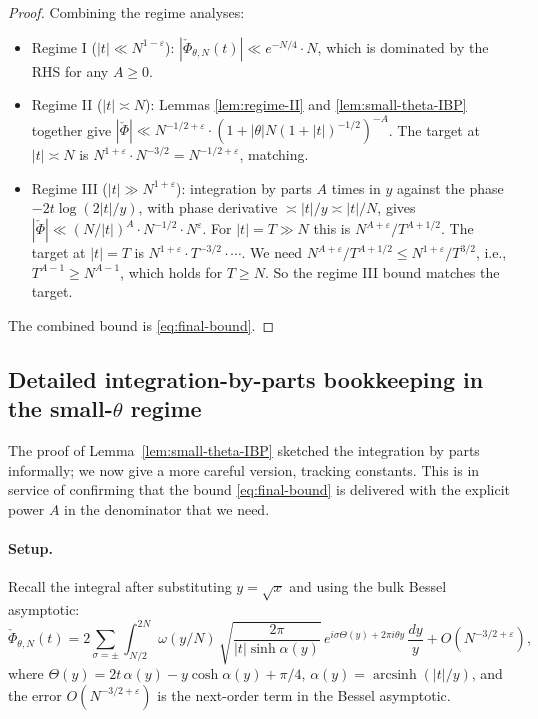 \documentclass[11pt]{article}
\theoremstyle{definition}
\newcommand{\ash}{\operatorname{arcsinh}}
\begin{document}
\begin{proof}
Combining the regime analyses:
\begin{itemize}
   \item Regime I ($|t| \ll N^{1-\varepsilon}$): $|\check\Phi_{\theta,N}(t)| \ll e^{-N/4}\cdot N$, which is dominated by the RHS for any $A \ge 0$.
   \item Regime II ($|t| \asymp N$): Lemmas \ref{lem:regime-II} and \ref{lem:small-theta-IBP} together give $|\check\Phi| \ll N^{-1/2+\varepsilon}\cdot(1+|\theta|N(1+|t|)^{-1/2})^{-A}$. The target at $|t| \asymp N$ is $N^{1+\varepsilon}\cdot N^{-3/2} = N^{-1/2+\varepsilon}$, matching.
   \item Regime III ($|t| \gg N^{1+\varepsilon}$): integration by parts $A$ times in $y$ against the phase $-2t\log(2|t|/y)$, with phase derivative $\asymp |t|/y \asymp |t|/N$, gives $|\check\Phi| \ll (N/|t|)^A \cdot N^{-1/2}\cdot N^{\varepsilon}$. For $|t| = T \gg N$ this is $N^{A+\varepsilon}/T^{A+1/2}$. The target at $|t| = T$ is $N^{1+\varepsilon}\cdot T^{-3/2}\cdot \cdots$. We need $N^{A+\varepsilon}/T^{A+1/2} \le N^{1+\varepsilon}/T^{3/2}$, i.e., $T^{A-1} \ge N^{A-1}$, which holds for $T \ge N$. So the regime III bound matches the target.
\end{itemize}
The combined bound is \eqref{eq:final-bound}.
\end{proof}

\subsection{Detailed integration-by-parts bookkeeping in the small-$\theta$ regime}\label{ssec:IBP-detail}

The proof of Lemma~\ref{lem:small-theta-IBP} sketched the integration by parts informally; we now give a more careful version, tracking constants. This is in service of confirming that the bound \eqref{eq:final-bound} is delivered with the explicit power $A$ in the denominator that we need.

\paragraph{Setup.}
Recall the integral after substituting $y = \sqrt x$ and using the bulk Bessel asymptotic:
\begin{equation}\label{eq:IBP-setup}
    \check\Phi_{\theta,N}(t) = 2\sum_{\sigma=\pm}\int_{N/2}^{2N}\omega(y/N)\,\sqrt{\frac{2\pi}{|t|\sinh\alpha(y)}}\,e^{i\sigma\Theta(y)+2\pi i\theta y}\,\frac{dy}{y}+ O(N^{-3/2+\varepsilon}),
\end{equation}
where $\Theta(y) = 2t\,\alpha(y) - y\cosh\alpha(y) + \pi/4$, $\alpha(y) = \ash(|t|/y)$, and the error $O(N^{-3/2+\varepsilon})$ is the next-order term in the Bessel asymptotic.
\end{document}
